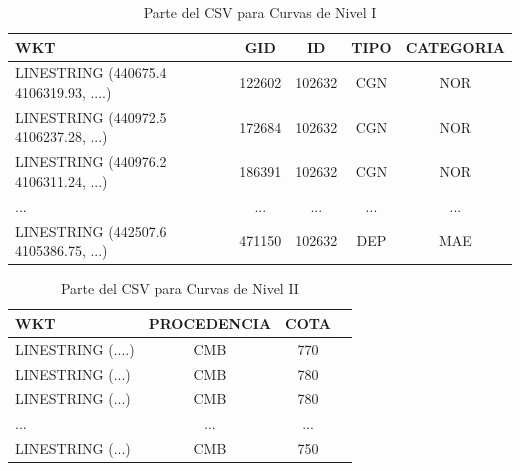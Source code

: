 \begin{table}[H]
	\centering
	\caption{Parte del CSV para Curvas de Nivel I}
	\label{csv-curva1}
	\begin{tabular}{|m{4.2cm}|c|c|c|c|}
		\hline
		\rowcolor[HTML]{EFEFEF} 
		\textbf{WKT} & \textbf{GID} & \textbf{ID} & \textbf{TIPO} & \textbf{CATEGORIA}  \\ \hline
		LINESTRING (440675.4 4106319.93, ....)       & 122602       & 102632            & CGN           & NOR                           \\ \hline
		LINESTRING (440972.5 4106237.28, ...)     & 172684       & 102632            & CGN           & NOR                       \\ \hline
		LINESTRING (440976.2 4106311.24, ...)              & 186391       & 102632            & CGN           & NOR                        \\ \hline
	...                                & ...       & ...            & ...           & ...                      \\ \hline
	
	LINESTRING (442507.6 4105386.75, ...)             & 471150       & 102632            & DEP           & MAE                       \\ \hline
	\end{tabular}
\end{table}

\begin{table}[H]
	\centering
	\caption{Parte del CSV para Curvas de Nivel II}
	\label{csv-curvas2}
	\begin{tabular}{|m{4.2cm}|c|c|c|}
		\hline
		\rowcolor[HTML]{EFEFEF} 
		\textbf{WKT}  & \textbf{PROCEDENCIA} & \textbf{COTA} \\ \hline
		LINESTRING (....)                  & CMB                 & 770           \\ \hline
		LINESTRING (...)                   & CMB                 & 780           \\ \hline
		LINESTRING (...)                      & CMB                 & 780           \\ \hline
		...                                & ...       & ...                  \\ \hline
		
		LINESTRING (...)                              & CMB                 & 750           \\ \hline
	\end{tabular}
\end{table}


